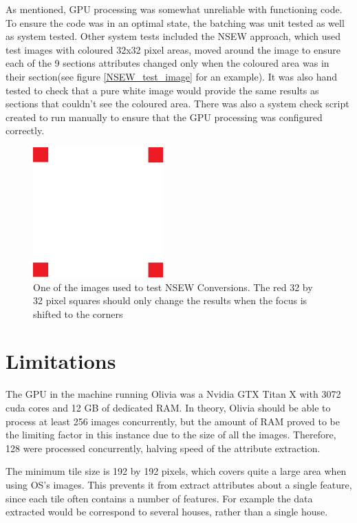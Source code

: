 As mentioned, GPU processing was somewhat unreliable with functioning code. To ensure the code was in an optimal state, the batching was unit tested as well as system tested. Other system tests included the NSEW approach, which used test images with coloured 32x32 pixel areas, moved around the image to ensure each of the 9 sections attributes changed only when the coloured area was in their section(see figure \ref{NSEW_test_image} for an example). It was also hand tested to check that a pure white image would provide the same results as sections that couldn’t see the coloured area. There was also a system check script created to run manually to ensure that the GPU processing was configured correctly.

\begin{figure}[H]
    \centering
    \includegraphics[width=5cm]{figs/7/NSEW_test_img}
    \caption{One of the images used to test NSEW Conversions. The red 32 by 32 pixel squares should only change the results when the focus is shifted to the corners}
    \label{fig:NSEW_test_image}
\end{figure}


\section{Limitations} \label{section:olivia:limits}
The GPU in the machine running Olivia was a Nvidia GTX Titan X with 3072 cuda cores and 12 GB of dedicated RAM. In theory, Olivia should be able to process at least 256 images concurrently, but the amount of RAM proved to be the limiting factor in this instance due to the size of all the images. Therefore, 128 were processed concurrently, halving speed of the attribute extraction.

The minimum tile size is 192 by 192 pixels, which covers quite a large area when using OS’s images. This prevents it from extract attributes about a single feature, since each tile often contains a number of features. For example the data extracted would be correspond to several houses, rather than a single house. 

